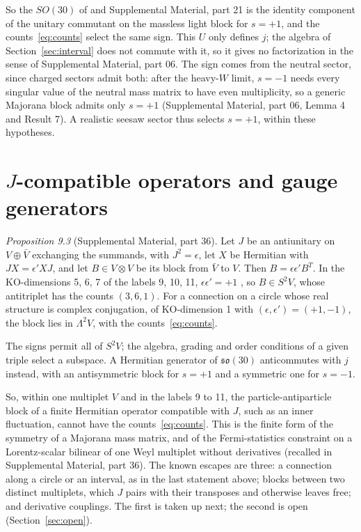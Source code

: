 \documentclass[aps,prd,reprint,onecolumn,nofootinbib,amsmath,amssymb,floatfix]{revtex4-2}
\theoremstyle{plain}
\newcommand{\supp}[1]{Supplemental Material, part #1}
\begin{document}
So the $SO(30)$ of \cite{Rivero2024} and \supp{21} is the identity component of the unitary commutant on the massless light block for $s=+1$, and the counts~\eqref{eq:counts} select the same sign. This $U$ only defines $j$; the algebra of Section~\ref{sec:interval} does not commute with it, so it gives no factorization in the sense of \supp{06}. The sign comes from the neutral sector, since charged sectors admit both: after the heavy-$W$ limit, $s=-1$ needs every singular value of the neutral mass matrix to have even multiplicity, so a generic Majorana block admits only $s=+1$ (\supp{06}, Lemma 4 and Result 7). A realistic seesaw sector thus selects $s=+1$, within these hypotheses.

\section{\texorpdfstring{$J$}{J}-compatible operators and gauge generators}\label{sec:J}

\smallskip\noindent\textit{Proposition 9.3} (\supp{36}). Let $J$ be an antiunitary on $V\oplus\bar V$ exchanging the summands, with $J^2=\epsilon$, let $X$ be Hermitian with $JX=\epsilon'XJ$, and let $B\in V\otimes V$ be its block from $\bar V$ to $V$. Then $B=\epsilon\epsilon'B^T$. In the KO-dimensions 5, 6, 7 of the labels 9, 10, 11, $\epsilon\epsilon'=+1$ \cite{Connes2006}, so $B\in S^2V$, whose antitriplet has the counts $(3,6,1)$. For a connection on a circle whose real structure is complex conjugation, of KO-dimension 1 with $(\epsilon,\epsilon')=(+1,-1)$, the block lies in $\Lambda^2V$, with the counts~\eqref{eq:counts}.
\smallskip

The signs permit all of $S^2V$; the algebra, grading and order conditions of a given triple select a subspace. A Hermitian generator of $\mathfrak{so}(30)$ anticommutes with $j$ instead, with an antisymmetric block for $s=+1$ and a symmetric one for $s=-1$.

So, within one multiplet $V$ and in the labels 9 to 11, the particle-antiparticle block of a finite Hermitian operator compatible with $J$, such as an inner fluctuation, cannot have the counts~\eqref{eq:counts}. This is the finite form of the symmetry of a Majorana mass matrix, and of the Fermi-statistics constraint on a Lorentz-scalar bilinear of one Weyl multiplet without derivatives (recalled in \supp{36}). The known escapes are three: a connection along a circle or an interval, as in the last statement above; blocks between two distinct multiplets, which $J$ pairs with their transposes and otherwise leaves free; and derivative couplings. The first is taken up next; the second is open (Section~\ref{sec:open}).
\end{document}
